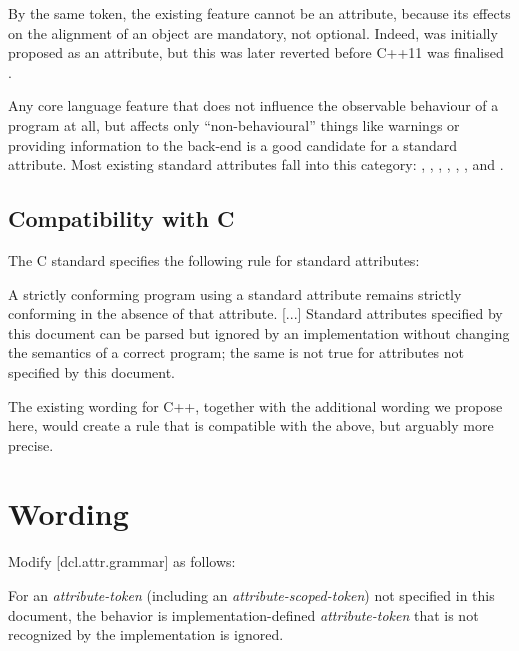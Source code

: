 By the same token, the existing feature  cannot be an attribute, because its effects on the alignment of an object are mandatory, not optional. Indeed,  was initially proposed as an attribute, but this was later reverted before C++11 was finalised \cite{N3190}.

Any core language feature that does not influence the observable behaviour of a program at all, but affects only ``non-behavioural'' things like warnings or providing information to the back-end is a good candidate for a standard attribute. Most existing standard attributes fall into this category: , \tcode{[[deprecated]]}, \tcode{[[fallthrough]]}, \tcode{[[likely]]}, \tcode{[[unlikely]]}, , and \tcode{[[nodiscard]]}.

\subsection{Compatibility with C}
\label{subsec:c_compat}

The C standard specifies the following rule for standard attributes:

\begin{adjustwidth}{0.5cm}{0.5cm}
A strictly conforming program using a standard attribute remains
strictly conforming in the absence of that attribute. [...] Standard attributes specified by this document can be parsed but
ignored by an implementation without changing the semantics of a
correct program; the same is not true for attributes not specified by
this document.
\end{adjustwidth}

The existing wording for C++, together with the additional wording we propose here, would create a rule that is compatible with the above, but arguably more precise.

\section{Wording}

Modify [dcl.attr.grammar] as follows:

\begin{adjustwidth}{0.5cm}{0.5cm}

For an \emph{attribute-token} (including an \emph{attribute-scoped-token})  not specified in this document, the behavior is implementation-defined \emph{attribute-token} that is not recognized by the implementation is ignored.
\end{adjustwidth}


\renewcommand{\bibname}{References}



